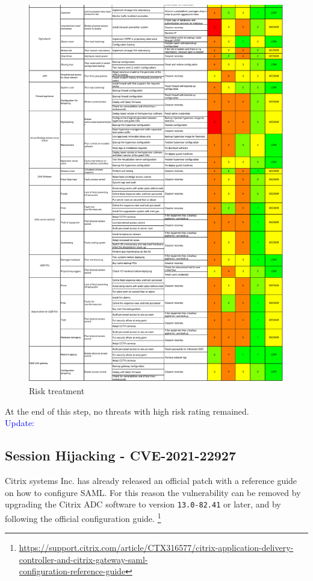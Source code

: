 \begin{figure}[t!]
    \centering
    \includegraphics[keepaspectratio,width=1\textwidth]{03-risk-analysis/005-RT/img/riskTreatCut2.pdf}
    \caption{Risk treatment}
    \label{fig:riskTreatCut2}
\end{figure}

At the end of this step, no threats with high risk rating remained.\\

\noindent \textcolor{blue}{Update:}

\subsection*{Session Hijacking - CVE-2021-22927}

Citrix systems Inc. has already released an official patch with a reference guide on how to configure SAML. For this reason the vulnerability can be removed by upgrading the Citrix ADC software to version \texttt{13.0-82.41} or later, and by following the official configuration guide. \footnote{\href{https://support.citrix.com/article/CTX316577/citrix-application-delivery-controller-and-citrix-gateway-saml-configuration-reference-guide} {https://support.citrix.com/article/CTX316577/citrix-application-delivery-controller-and-citrix-gateway-saml-\\configuration-reference-guide}}

